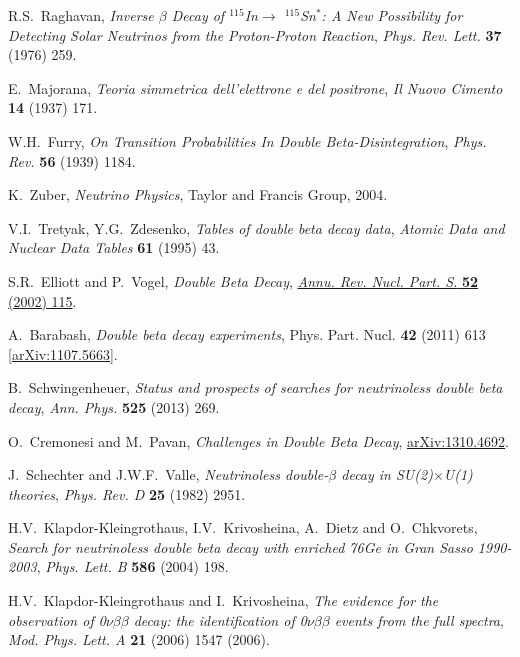 \documentclass{JINST}
\begin{document}
\begin{thebibliography}{35}
R.S.~Raghavan, \emph{Inverse $\beta$ Decay of $^{115}$In$\rightarrow$ $^{115}$Sn$^{*}$: A New Possibility for Detecting Solar Neutrinos from the Proton-Proton Reaction}, \emph{Phys. Rev. Lett.} {\bf37} (1976) 259.

E.~Majorana, \emph{Teoria simmetrica dell'elettrone e del positrone}, \emph{Il Nuovo Cimento} {\bf 14} (1937) 171. 

W.H.~Furry, \emph{On Transition Probabilities In Double Beta-Disintegration}, \emph{Phys. Rev.} {\bf 56} (1939) 1184. 

K.~Zuber, \emph{Neutrino Physics}, Taylor and Francis Group, 2004.

V.I.~Tretyak, Y.G.~Zdesenko, \emph{Tables of double beta decay data}, \emph{Atomic Data and Nuclear Data Tables} {\bf 61} (1995) 43. 

S.R.~Elliott and P.~Vogel, \emph{Double Beta Decay}, \href{http://www.annualreviews.org/doi/abs/10.1146/annurev.nucl.52.050102.090641}{\emph{Annu. Rev. Nucl. Part. S.} {\bf 52} (2002) 115}.

A.~Barabash, \emph{Double beta decay experiments}, Phys. Part. Nucl. {\bf 42} (2011) 613 [\href{http://arxiv.org/abs/1107.5663}{arXiv:1107.5663}].

B.~Schwingenheuer, \emph{Status and prospects of searches for neutrinoless double beta decay}, \emph{Ann. Phys.} {\bf 525} (2013) 269.

O.~Cremonesi and M.~Pavan, \emph{Challenges in Double Beta Decay}, \href{http://arxiv.org/abs/1310.4692}{arXiv:1310.4692}.

J.~Schechter and J.W.F.~Valle, \emph{Neutrinoless double-$\beta$ decay in SU(2)$\times$U(1) theories}, \emph{Phys. Rev. D} {\bf 25} (1982) 2951.  

H.V.~Klapdor-Kleingrothaus, I.V.~Krivosheina, A.~Dietz and O.~Chkvorets, \emph{Search for neutrinoless double beta decay with enriched 76Ge in Gran Sasso 1990-2003}, \emph{Phys. Lett. B} {\bf 586} (2004) 198.

H.V.~Klapdor-Kleingrothaus and I.~Krivosheina, \emph{The evidence for the observation of 0$\nu\beta\beta$ decay: the identification of 0$\nu\beta\beta$ events from the full spectra}, \emph{Mod. Phys. Lett. A} {\bf 21} (2006) 1547 (2006).


\end{thebibliography}
\end{document}
